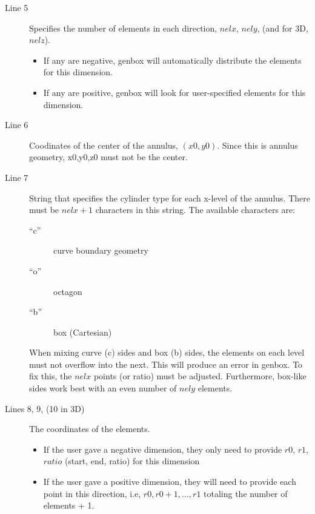 \begin{description}

  \item[Line 5] Specifies the number of elements in each direction, $nelx$,
    $nely$, (and for 3D, $nelz$).

    \begin{itemize}

      \item If any are negative, genbox will automatically distribute the
        elements for this dimension.

      \item If any are positive, genbox will look for user-specified elements
        for this dimension.

    \end{itemize}

  \item[Line 6] Coodinates of the center of the annulus, $(x0, y0)$. Since this
    is annulus geometry, x0,y0,z0 must not be the center.

  \item[Line 7] String that specifies the cylinder type for each x-level of the
    annulus.  There must be $nelx+1$ characters in this string.  The available
    characters are:

    \begin{description}
      \item[``c''] curve boundary geometry
      \item[``o''] octagon
      \item[``b''] box (Cartesian)
    \end{description}

    When mixing curve (c) sides and box (b) sides, the elements on each level
    must not overflow into the next.  This will produce an error in genbox.  To
    fix this, the $nelx$ points (or ratio) must be adjusted.  Furthermore,
    box-like sides work best with an even number of $nely$ elements.

  \item[Lines 8, 9, (10 in 3D)] The coordinates of the elements.

    \begin{itemize}

      \item If the user gave a negative dimension, they only need to provide
        $r0$, $r1$, $ratio$ (start, end, ratio) for this dimension

      \item If the user gave a positive dimension, they will need to provide
        each point in this direction, i.e, $r0, r0+1, \ldots, r1$ totaling the
        number of elements + 1.

    \end{itemize}

\end{description}

